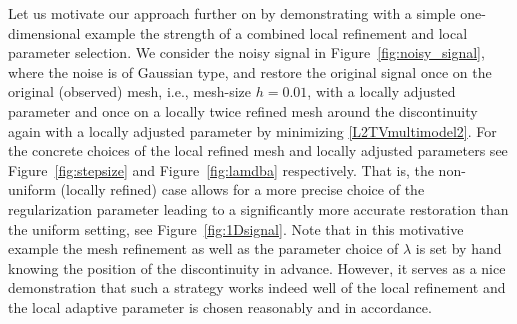 \documentclass[enabledeprecatedfontcommands,cleardoublepage=empty,headsepline,twoside,11pt,DIV=15,BCOR=12mm,final]{scrartcl}
\begin{document}
Let us motivate our approach further on by demonstrating with a simple one-dimensional example the strength of a combined local refinement and local parameter selection. We consider the noisy signal in Figure~\ref{fig:noisy_signal}, where the noise is of Gaussian type, and restore the original signal once on the original (observed) mesh, i.e., mesh-size $h=0.01$, with a locally adjusted parameter and once on a locally twice refined mesh around the discontinuity again with a locally adjusted parameter by minimizing \eqref{L2TVmultimodel2}. For the concrete choices of the local refined mesh and locally adjusted parameters see Figure~\ref{fig:stepsize} and Figure~\ref{fig:lamdba} respectively. That is, the non-uniform (locally refined) case allows for a more precise choice of the regularization parameter leading to a significantly more accurate restoration than the uniform setting, see Figure~\ref{fig:1Dsignal}.
 Note that in this motivative example the mesh refinement as well as the parameter choice of $\lambda$ is set by hand knowing the position of the discontinuity in advance. However, it serves as a nice demonstration that such a strategy works indeed well of the local refinement and the local adaptive parameter is chosen reasonably and in accordance. 
 
\end{document}
